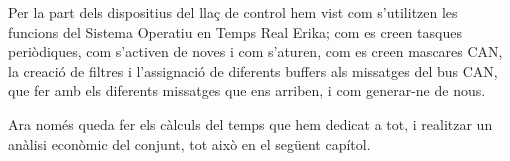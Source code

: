 Per la part dels dispositius del llaç de control hem vist com s'utilitzen les funcions del Sistema Operatiu en Temps Real Erika; com es creen tasques periòdiques, com s'activen de noves i com s'aturen,  com es creen mascares CAN, la creació de filtres i l'assignació de diferents buffers als missatges del bus CAN, que fer amb els diferents missatges que ens arriben, i com generar-ne de nous.

Ara només queda fer els càlculs del temps que hem dedicat a tot, i realitzar un anàlisi econòmic del conjunt, tot això en el següent capítol.

